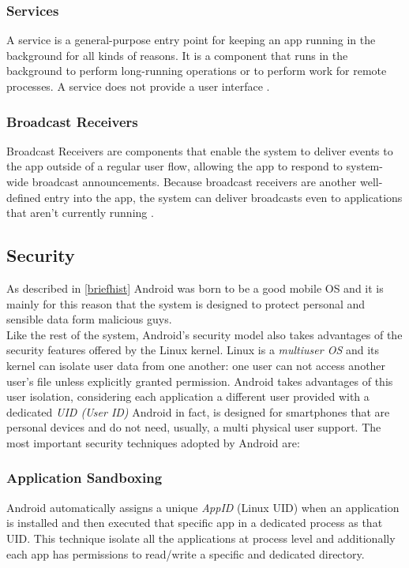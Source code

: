 \subsubsection{Services} A service is a general-purpose entry point for keeping an app running in the background for all kinds of reasons. It is a component that runs in the background to perform long-running operations or to perform work for remote processes. A service does not provide a user interface \cite{devandroifundamentals}. 

\subsubsection{Broadcast Receivers} Broadcast Receivers are components that enable the system to deliver events to the app outside of a regular user flow, allowing the app to respond to system-wide broadcast announcements. Because broadcast receivers are another well-defined entry into the app, the system can deliver broadcasts even to applications that aren't currently running \cite{devandroifundamentals}.

\subsection{Security}\label{androidsecurity}
\par
As described in \ref{briefhist} Android was born to be a good mobile OS and it is mainly for this reason that the system is designed to protect personal and sensible data form malicious guys.\\
Like the rest of the system, Android's security model also takes advantages of the security features offered by the Linux kernel. Linux is a \textit{multiuser OS} and its kernel can isolate user data from one another: one user can not access another user's file unless explicitly granted permission. Android takes advantages of this user isolation, considering each application a different user provided with a dedicated \textit{UID (User ID)} \cite{elenkov2014android} Android in fact, is designed for smartphones that are personal devices and do not need, usually, a multi physical user support.
The most important security techniques adopted by Android are:

	\subsubsection{Application Sandboxing} Android automatically assigns a unique \textit{AppID} (Linux UID) when an application is installed and then executed that specific app in a dedicated process as that UID. This technique isolate all the applications at process level and additionally each app has permissions to read/write a specific and dedicated directory.
	
